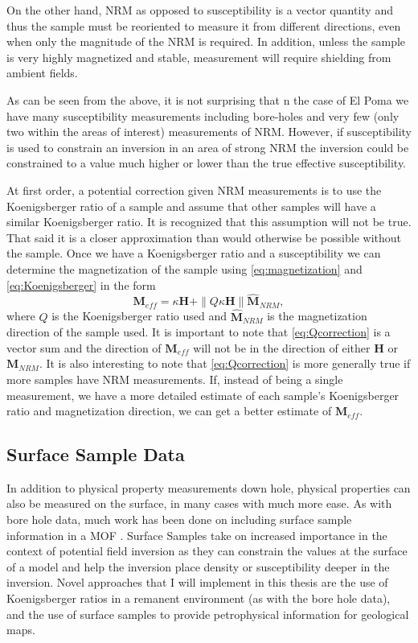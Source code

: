 On the other hand, \ac{NRM} as opposed to susceptibility is a vector quantity and thus the sample must be reoriented to measure it from different directions, even when only the magnitude of the \ac{NRM} is required. In addition, unless the sample is very highly magnetized and stable, measurement will require shielding from ambient fields.

As can be seen from the above, it is not surprising that n the case of El Poma we have many susceptibility measurements including bore-holes and very few (only two within the areas of interest) measurements of \ac{NRM}. However, if susceptibility is used to constrain an inversion in an area of strong \ac{NRM} the inversion could be constrained to a value much higher or lower than the true effective susceptibility. 

At first order, a potential correction given \ac{NRM} measurements is to use the Koenigsberger ratio of a sample and assume that other samples will have a similar Koenigsberger ratio. It is recognized that this assumption will not be true. That said it is a closer approximation than would otherwise be possible without the sample. Once we have a Koenigsberger ratio and a susceptibility we can determine the magnetization of the sample using \autoref{eq:magnetization} and  \autoref{eq:Koenigsberger} in the form
\begin{equation} \label{eq:Qcorrection}
\textbf{M}_{eff} = \kappa\textbf{H} + \|Q\kappa\textbf{H}\|\hat{\mathbf M}_{NRM},
\end{equation}	
where $Q$ is the Koenigsberger ratio used and $\hat{\mathbf M}_{NRM}$ is the magnetization direction of the sample used. It is important to note that \autoref{eq:Qcorrection} is a vector sum and the direction of $\mathbf{M}_{eff}$ will not be in the direction of either $\mathbf H$ or $\mathbf M_{NRM}$. It is also interesting to note that \autoref{eq:Qcorrection} is more generally true if more samples have \ac{NRM} measurements. If, instead of being a single measurement, we have a more detailed estimate of each sample's Koenigsberger ratio and magnetization direction, we can get a better estimate of $\mathbf M_{eff}$.
	
\subsection{Surface Sample Data}
\label{sec: Surface Sample Data}

In addition to physical property measurements down hole, physical properties can also be measured on the surface, in many cases with much more ease. As with bore hole data, much work  has been done on including surface sample information in a \ac{MOF} \cite{williams2008geologically}. Surface Samples take on increased importance in the context of potential field inversion as they can constrain the values at the surface of a model and help the inversion place density or susceptibility deeper in the inversion. Novel approaches that I will implement in this thesis are the use of Koenigsberger ratios in a remanent environment (as with the bore hole data), and the use of surface samples to provide petrophysical information for geological maps.

